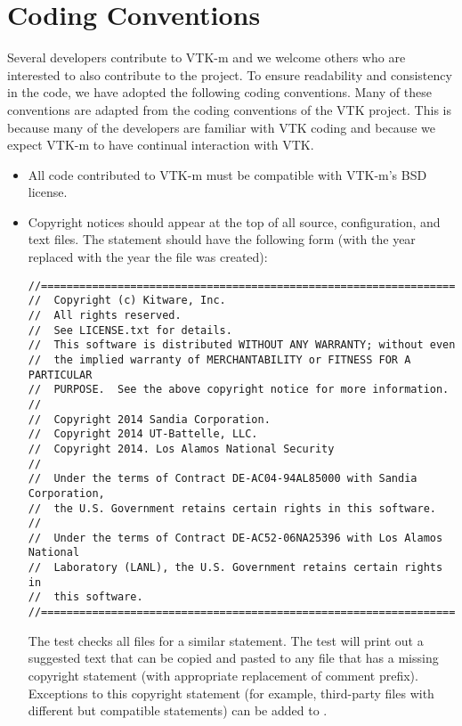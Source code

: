 
\chapter{Coding Conventions}
\label{chap:CodingConventions}

Several developers contribute to VTK-m and we welcome others who are
interested to also contribute to the project. To ensure readability and
consistency in the code, we have adopted the following coding
conventions. Many of these conventions are adapted from the coding
conventions of the VTK project. This is because many of the developers are
familiar with VTK coding and because we expect VTK-m to have continual
interaction with VTK.

\begin{itemize}
\item All code contributed to VTK-m must be compatible with VTK-m's BSD
  license.
\item Copyright notices should appear at the top of all source,
  configuration, and text files. The statement should have the following
  form (with the year replaced with the year the file was created):
\small\begin{verbatim}
//============================================================================
//  Copyright (c) Kitware, Inc.
//  All rights reserved.
//  See LICENSE.txt for details.
//  This software is distributed WITHOUT ANY WARRANTY; without even
//  the implied warranty of MERCHANTABILITY or FITNESS FOR A PARTICULAR
//  PURPOSE.  See the above copyright notice for more information.
//
//  Copyright 2014 Sandia Corporation.
//  Copyright 2014 UT-Battelle, LLC.
//  Copyright 2014. Los Alamos National Security
//
//  Under the terms of Contract DE-AC04-94AL85000 with Sandia Corporation,
//  the U.S. Government retains certain rights in this software.
//
//  Under the terms of Contract DE-AC52-06NA25396 with Los Alamos National
//  Laboratory (LANL), the U.S. Government retains certain rights in
//  this software.
//============================================================================
\end{verbatim}
  The  test checks all files for a similar
  statement. The test will print out a suggested text that can be copied
  and pasted to any file that has a missing copyright statement (with
  appropriate replacement of comment prefix). Exceptions to this copyright
  statement (for example, third-party files with different but compatible
  statements) can be added to .

\end{itemize}
